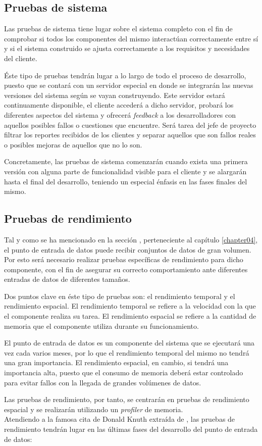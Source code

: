 \subsection{Pruebas de sistema}
Las pruebas de sistema tiene lugar sobre el sistema completo con el fin de comprobar si todos los componentes del mismo interactúan correctamente entre sí y si el sistema construido se ajusta correctamente a los requisitos y necesidades del cliente.

Éste tipo de pruebas tendrán lugar a lo largo de todo el proceso de desarrollo, puesto que se contará con un servidor especial en donde se integrarán las nuevas versiones del sistema según se vayan construyendo.  Este servidor estará continuamente disponible, el cliente accederá a dicho servidor, probará los diferentes aspectos del sistema y ofrecerá \textit{feedback} a los desarrolladores con aquellos posibles fallos o cuestiones que encuentre.  Será tarea del jefe de proyecto filtrar los reportes recibidos de los clientes y separar aquellos que son fallos reales o posibles mejoras de aquellos que no lo son.

Concretamente, las pruebas de sistema comenzarán cuando exista una primera versión con alguna parte de funcionalidad visible para el cliente y se alargarán hasta el final del desarrollo, teniendo un especial énfasis en las fases finales del mismo.


\subsection{Pruebas de rendimiento}
Tal y como se ha mencionado en la sección , perteneciente al capítulo \ref{chapter04}, el punto de entrada de datos puede recibir conjuntos de datos de gran volumen.  Por esto será necesario realizar pruebas específicas de rendimiento para dicho componente, con el fin de asegurar su correcto comportamiento ante diferentes entradas de datos de diferentes tamaños.

Dos puntos clave en éste tipo de pruebas son: el rendimiento temporal y el rendimiento espacial.  El rendimiento temporal se refiere a la velocidad con la que el componente realiza su tarea.  El rendimiento espacial se refiere a la cantidad de memoria que el componente utiliza durante su funcionamiento.

El punto de entrada de datos es un componente del sistema que se ejecutará una vez cada varios meses, por lo que el rendimiento temporal del mismo no tendrá una gran importancia.  El rendimiento espacial, en cambio, si tendrá una importancia alta, puesto que el consumo de memoria deberá estar controlado para evitar fallos con la llegada de grandes volúmenes de datos.

Las pruebas de rendimiento, por tanto, se centrarán en pruebas de rendimiento espacial y se realizarán utilizando un \textit{profiler} de memoria.\\
Atendiendo a la famosa cita de Donald Knuth extraída de \cite{knuth:structuredprogramming}, las pruebas de rendimiento tendrán lugar en las últimas fases del desarrollo del punto de entrada de datos:  



